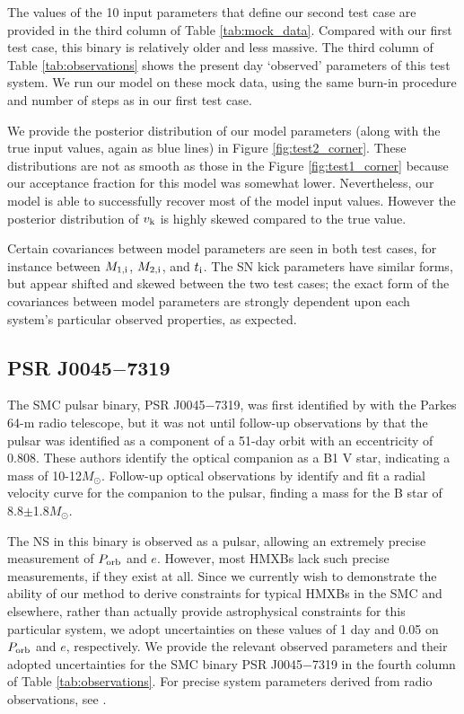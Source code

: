 \documentclass[usenatbib]{mnras}
\newcommand{\Msun}{\ifmmode {M_{\odot}}\else${M_{\odot}}$\fi}
\begin{document}
The values of the 10 input parameters that define our second test case are provided in the third column of Table \ref{tab:mock_data}. Compared with our first test case, this binary is relatively older and less massive. The third column of Table \ref{tab:observations} shows the present day `observed' parameters of this test system. We run our model on these mock data, using the same burn-in procedure and number of steps as in our first test case.

We provide the posterior distribution of our model parameters (along with the true input values, again as blue lines) in Figure \ref{fig:test2_corner}. These distributions are not as smooth as those in the Figure \ref{fig:test1_corner} because our acceptance fraction for this model was somewhat lower. Nevertheless, our model is able to successfully recover most of the model input values. However the posterior distribution of $v_{\rm k}$ is highly skewed compared to the true value. 


Certain covariances between model parameters are seen in both test cases, for instance between $M_{\rm 1,i}$, $M_{\rm 2,i}$, and $t_{\rm i}$. The SN kick parameters have similar forms, but appear shifted and skewed between the two test cases; the exact form of the covariances between model parameters are strongly dependent upon each system's particular observed properties, as expected. 


\subsection{PSR J0045$-$7319}

The SMC pulsar binary, PSR J0045$-$7319, was first identified by \citet{ables87} with the Parkes 64-m radio telescope, but it was not until follow-up observations by \citet{kaspi94} that the pulsar was identified as a component of a 51-day orbit with an eccentricity of 0.808. These authors identify the optical companion as a B1 V star, indicating a mass of 10-12\Msun. Follow-up optical observations by \citet{bell95} identify and fit a radial velocity curve for the companion to the pulsar, finding a mass for the B star of 8.8$\pm$1.8\Msun. 

The NS in this binary is observed as a pulsar, allowing an extremely precise measurement of $P_{\rm orb}$ and $e$. However, most HMXBs lack such precise measurements, if they exist at all. Since we currently wish to demonstrate the ability of our method to derive constraints for typical HMXBs in the SMC and elsewhere, rather than actually provide astrophysical constraints for this particular system, we adopt uncertainties on these values of 1 day and 0.05 on $P_{\rm orb}$ and $e$, respectively. We provide the relevant observed parameters and their adopted uncertainties for the SMC binary PSR J0045$-$7319 in the fourth column of Table \ref{tab:observations}. For precise system parameters derived from radio observations, see \citet{kaspi94}.
\end{document}
